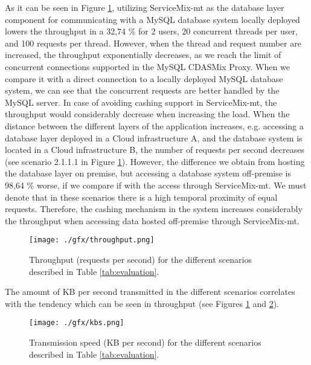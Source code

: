As it can be seen in Figure \ref{fig:throughput}, utilizing ServiceMix-mt as the database layer component for communicating with a MySQL database system locally deployed lowers the throughput in a 32,74 \% for 2 users, 20 concurrent threads per user, and 100 requests per thread. However, when the thread and request number are increased, the throughput exponentially decreases, as we reach the limit of concurrent connections supported in the MySQL CDASMix Proxy. When we compare it with a direct connection to a locally deployed MySQL database system, we can see that the concurrent requests are better handled by the MySQL server. In case of avoiding cashing support in ServiceMix-mt, the throughput would considerably decrease when increasing the load. When the distance between the different layers of the application increases, e.g. accessing a database layer deployed in a Cloud infrastructure A, and the database system is located in a Cloud infrastructure B, the number of requests per second decreases (see scenario 2.1.1.1 in Figure \ref{fig:throughput}). However, the difference we obtain from hosting the database layer on premise, but accessing a database system off-premise is 98,64 \% worse, if we compare if with the access through ServiceMix-mt. We must denote that in these scenarios there is a high temporal proximity of equal requests. Therefore, the cashing mechanism in the system increases considerably the throughput when accessing data hosted off-premise through ServiceMix-mt.
 
\begin{figure}[htb]
	\centering
		\texttt{[image: ./gfx/throughput.png]}
	\caption[Evaluation Analysis - Throughput]{Throughput (requests per second) for the different scenarios described in Table \ref{tab:evaluation}.}
	\label{fig:throughput}
\end{figure}

\FloatBarrier

The amount of KB per second transmitted in the different scenarios correlates with the tendency which can be seen in throughput (see Figures \ref{fig:throughput} and \ref{fig:kbs}).

\begin{figure}[htb]
	\centering
		\texttt{[image: ./gfx/kbs.png]}
	\caption[Evaluation Analysis - Transmission Speed]{Transmission speed (KB per second) for the different scenarios described in Table \ref{tab:evaluation}.}
	\label{fig:kbs}
\end{figure}

